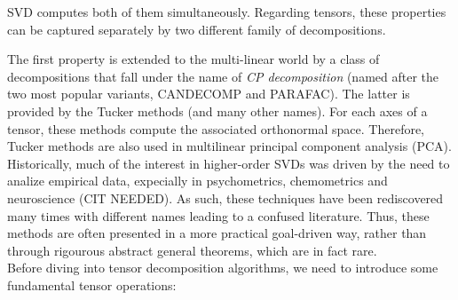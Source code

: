 SVD computes both of them simultaneously. Regarding tensors, these properties can be captured separately by two different family of decompositions.

The first property is extended to the multi-linear world by a class of decompositions that fall under the name of \textit{CP decomposition} (named after the two most popular variants, CANDECOMP and PARAFAC). The latter is provided by the Tucker methods (and many other names). For each axes of a tensor, these methods compute the associated orthonormal space. Therefore, Tucker methods are also used in multilinear principal component analysis (PCA). \\
Historically, much of the interest in higher-order SVDs was driven by the need to analize empirical data, expecially in psychometrics, chemometrics and neuroscience (CIT NEEDED). As such, these techniques have been rediscovered many times with different names leading to a confused literature. Thus, these methods are often presented in a more practical goal-driven way, rather than through rigourous abstract general theorems, which are in fact rare.\\

Before diving into tensor decomposition algorithms, we need to introduce some fundamental tensor operations: 

